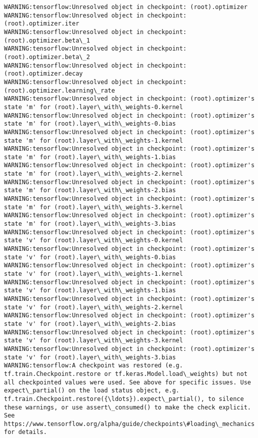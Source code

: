 \documentclass[11pt]{article}
\begin{document}
    \begin{Verbatim}[commandchars=\\\{\}]
WARNING:tensorflow:Unresolved object in checkpoint: (root).optimizer
WARNING:tensorflow:Unresolved object in checkpoint: (root).optimizer.iter
WARNING:tensorflow:Unresolved object in checkpoint: (root).optimizer.beta\_1
WARNING:tensorflow:Unresolved object in checkpoint: (root).optimizer.beta\_2
WARNING:tensorflow:Unresolved object in checkpoint: (root).optimizer.decay
WARNING:tensorflow:Unresolved object in checkpoint: (root).optimizer.learning\_rate
WARNING:tensorflow:Unresolved object in checkpoint: (root).optimizer's state 'm' for (root).layer\_with\_weights-0.kernel
WARNING:tensorflow:Unresolved object in checkpoint: (root).optimizer's state 'm' for (root).layer\_with\_weights-0.bias
WARNING:tensorflow:Unresolved object in checkpoint: (root).optimizer's state 'm' for (root).layer\_with\_weights-1.kernel
WARNING:tensorflow:Unresolved object in checkpoint: (root).optimizer's state 'm' for (root).layer\_with\_weights-1.bias
WARNING:tensorflow:Unresolved object in checkpoint: (root).optimizer's state 'm' for (root).layer\_with\_weights-2.kernel
WARNING:tensorflow:Unresolved object in checkpoint: (root).optimizer's state 'm' for (root).layer\_with\_weights-2.bias
WARNING:tensorflow:Unresolved object in checkpoint: (root).optimizer's state 'm' for (root).layer\_with\_weights-3.kernel
WARNING:tensorflow:Unresolved object in checkpoint: (root).optimizer's state 'm' for (root).layer\_with\_weights-3.bias
WARNING:tensorflow:Unresolved object in checkpoint: (root).optimizer's state 'v' for (root).layer\_with\_weights-0.kernel
WARNING:tensorflow:Unresolved object in checkpoint: (root).optimizer's state 'v' for (root).layer\_with\_weights-0.bias
WARNING:tensorflow:Unresolved object in checkpoint: (root).optimizer's state 'v' for (root).layer\_with\_weights-1.kernel
WARNING:tensorflow:Unresolved object in checkpoint: (root).optimizer's state 'v' for (root).layer\_with\_weights-1.bias
WARNING:tensorflow:Unresolved object in checkpoint: (root).optimizer's state 'v' for (root).layer\_with\_weights-2.kernel
WARNING:tensorflow:Unresolved object in checkpoint: (root).optimizer's state 'v' for (root).layer\_with\_weights-2.bias
WARNING:tensorflow:Unresolved object in checkpoint: (root).optimizer's state 'v' for (root).layer\_with\_weights-3.kernel
WARNING:tensorflow:Unresolved object in checkpoint: (root).optimizer's state 'v' for (root).layer\_with\_weights-3.bias
WARNING:tensorflow:A checkpoint was restored (e.g. tf.train.Checkpoint.restore or tf.keras.Model.load\_weights) but not all checkpointed values were used. See above for specific issues. Use expect\_partial() on the load status object, e.g. tf.train.Checkpoint.restore({\ldots}).expect\_partial(), to silence these warnings, or use assert\_consumed() to make the check explicit. See https://www.tensorflow.org/alpha/guide/checkpoints\#loading\_mechanics for details.

    \end{Verbatim}
\end{document}
